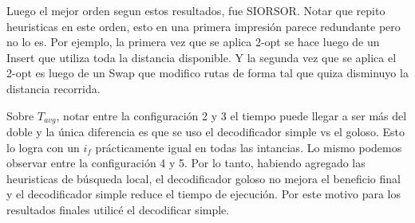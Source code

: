 \bigskip

Luego el mejor orden segun estos resultados, fue SIORSOR. Notar que repito heuristicas en este orden, esto en una primera impresión parece redundante pero no lo es. Por ejemplo, la primera vez que se aplica 2-opt se hace luego de un Insert que utiliza toda la distancia disponible. Y la segunda vez que se aplica el 2-opt es luego de un Swap que modifico rutas de forma tal que quiza disminuyo la distancia recorrida.

\bigskip

Sobre $T_{avg}$, notar entre la configuración 2 y 3 el tiempo puede llegar a ser más del doble y la única diferencia es que se uso el decodificador simple vs el goloso. Esto lo logra con un $i_f$ prácticamente igual en todas las intancias. Lo mismo podemos observar entre la configuración 4 y 5. Por lo tanto, habiendo agregado las heuristicas de búsqueda local, el decodificador goloso no mejora el beneficio final y el decodificador simple reduce el tiempo de ejecución. Por este motivo para los resultados finales utilicé el decodificar simple.


